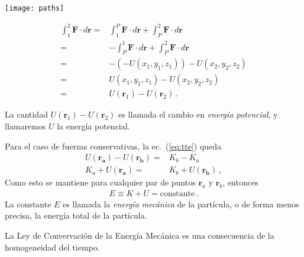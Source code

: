 \begin{minipage}{0.5\linewidth}
\texttt{[image: paths]}  
\end{minipage}
\begin{minipage}{0.5\linewidth}
  \begin{align}
  \int_1^2 \mathbf{F}\cdot d\mathbf{r}
  =&\int_1^P \mathbf{F}\cdot d\mathbf{r}+\int_P^2 \mathbf{F}\cdot d\mathbf{r}\nonumber\\
  =&-\int_P^1 \mathbf{F}\cdot d\mathbf{r}+\int_P^2 \mathbf{F}\cdot d\mathbf{r}\nonumber\\
  =&-(-U(x_1,y_1,z_1))-U(x_2,y_2,z_2)\nonumber\\
  =&U(x_1,y_1,z_1)-U(x_2,y_2,z_2)\nonumber\\
  =&U(\mathbf{r}_1)-U(\mathbf{r}_2)\,.
\end{align}
\end{minipage}

La cantidad $U(\mathbf{r}_1)-U(\mathbf{r}_2)$ es llamada el cambio en \emph{energía potencial}, y llamaremos $U$ la energía potencial.

Para el caso de fuerzas conservativas, la ec.~(\ref{eq:tte}) queda
\begin{align}
  U(\mathbf{r_a})-U(\mathbf{r_b})=&K_b-K_a\nonumber\\
  K_a+U(\mathbf{r_a})=&K_b+U(\mathbf{r_b})\,,
\end{align}
Como esto se mantiene para cualquier par de puntos $\mathbf{r}_a$ y $\mathbf{r}_b$, entonces
\begin{align}
  E\equiv K+U=\text{constante}\,.
\end{align}
La constante $E$ es llamada la \emph{energía mecánica} de la partícula, o de forma menos precisa, la energía total de la partícula. 

La Ley de Convervación de la Energía Mecánica es una consecuencia de la homogeneidad del tiempo.

